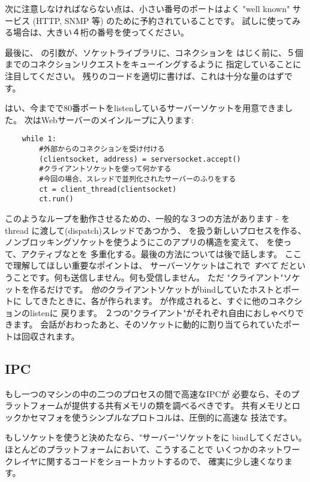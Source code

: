 \documentclass{howto}
\begin{document}
次に注意しなければならない点は、小さい番号のポートはよく "well known" 
サービス (HTTP, SNMP 等) のために予約されていることです。
試しに使ってみる場合は、大きい４桁の番号を使ってください。

最後に、 の引数が、ソケットライブラリに、コネクションを
はじく前に、５個までのコネクションリクエストをキューイングするように
指定していることに注目してください。
残りのコードを適切に書けば、これは十分な量のはずです。

はい、今までで80番ポートをlistenしているサーバーソケットを用意できました。
次はWebサーバーのメインループに入ります: 

\begin{verbatim}
    while 1:
        #外部からのコネクションを受け付ける
        (clientsocket, address) = serversocket.accept()
        #クライアントソケットを使って何かする
        #今回の場合、スレッドで並列化されたサーバーのふりをする
        ct = client_thread(clientsocket)
        ct.run()
\end{verbatim}

このようなループを動作させるための、一般的な３つの方法があります -
 を thread に渡して(dispatch)スレッドであつかう、
 を扱う新しいプロセスを作る、
ノンブロッキングソケットを使うようにこのアプリの構造を変えて、
を使って、アクティブなとを
多重化する。最後の方法については後で話します。
ここで理解してほしい重要なポイントは、 サーバーソケットはこれで
\emph{すべて} だということです。何も送信しません。何も受信しません。
ただ "クライアント"ソケットを作るだけです。
\emph{他の}クライアントソケットがbindしていたホストとポートに
してきたときに、各が作られます。
が作成されると、すぐに他のコネクションのlistenに
戻ります。 ２つの"クライアント"がそれぞれ自由におしゃべりできます。
会話がおわったあと、そのソケットに動的に割り当てられていたポートは回収されます。

\subsection{IPC} もし一つのマシンの中の二つのプロセスの間で高速なIPCが
必要なら、そのプラットフォームが提供する共有メモリの類を調べるべきです。
共有メモリとロックかセマフォを使うシンプルなプロトコルは、圧倒的に高速な
技法です。

もしソケットを使うと決めたなら、"サーバー"ソケットをに
bindしてください。 ほとんどのプラットフォームにおいて、こうすることで
いくつかのネットワークレイヤに関するコードをショートカットするので、
確実に少し速くなります。
\end{document}
